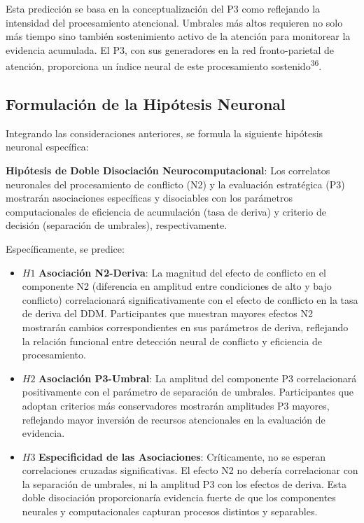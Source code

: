 \documentclass[
  spanish,
  10pt,
]{article}
\begin{document}
Esta predicción se basa en la conceptualización del P3 como reflejando
la intensidad del procesamiento atencional. Umbrales más altos requieren
no solo más tiempo sino también sostenimiento activo de la atención para
monitorear la evidencia acumulada. El P3, con sus generadores en la red
fronto-parietal de atención, proporciona un índice neural de este
procesamiento sostenido\textsuperscript{36}.

\subsection{Formulación de la Hipótesis
Neuronal}\label{formulaciuxf3n-de-la-hipuxf3tesis-neuronal}

Integrando las consideraciones anteriores, se formula la siguiente
hipótesis neuronal específica:

\textbf{Hipótesis de Doble Disociación Neurocomputacional}: Los
correlatos neuronales del procesamiento de conflicto (N2) y la
evaluación estratégica (P3) mostrarán asociaciones específicas y
disociables con los parámetros computacionales de eficiencia de
acumulación (tasa de deriva) y criterio de decisión (separación de
umbrales), respectivamente.

Específicamente, se predice:

\begin{itemize}
\item
  \(H1\) \textbf{Asociación N2-Deriva}: La magnitud del efecto de
  conflicto en el componente N2 (diferencia en amplitud entre
  condiciones de alto y bajo conflicto) correlacionará
  significativamente con el efecto de conflicto en la tasa de deriva del
  DDM. Participantes que muestran mayores efectos N2 mostrarán cambios
  correspondientes en sus parámetros de deriva, reflejando la relación
  funcional entre detección neural de conflicto y eficiencia de
  procesamiento.
\item
  \(H2\) \textbf{Asociación P3-Umbral}: La amplitud del componente P3
  correlacionará positivamente con el parámetro de separación de
  umbrales. Participantes que adoptan criterios más conservadores
  mostrarán amplitudes P3 mayores, reflejando mayor inversión de
  recursos atencionales en la evaluación de evidencia.
\item
  \(H3\) \textbf{Especificidad de las Asociaciones}: Críticamente, no se
  esperan correlaciones cruzadas significativas. El efecto N2 no debería
  correlacionar con la separación de umbrales, ni la amplitud P3 con los
  efectos de deriva. Esta doble disociación proporcionaría evidencia
  fuerte de que los componentes neurales y computacionales capturan
  procesos distintos y separables.
\end{itemize}
\end{document}
